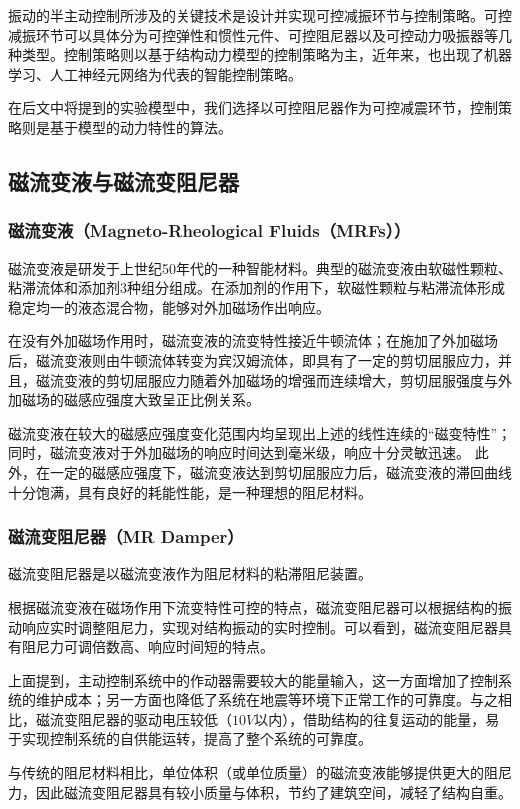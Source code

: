 振动的半主动控制所涉及的关键技术是设计并实现可控减振环节与控制策略。\cite{Hu2001}可控减振环节可以具体分为可控弹性和惯性元件、可控阻尼器以及可控动力吸振器等几种类型。控制策略则以基于结构动力模型的控制策略为主，近年来，也出现了机器学习、人工神经元网络为代表的智能控制策略。

在后文中将提到的实验模型中，我们选择以可控阻尼器作为可控减震环节，控制策略则是基于模型的动力特性的算法。

\subsection{磁流变液与磁流变阻尼器}
\subsubsection{磁流变液（Magneto-Rheological Fluids（MRFs））}
磁流变液是研发于上世纪50年代的一种智能材料。典型的磁流变液由软磁性颗粒、粘滞流体和添加剂3种组分组成。在添加剂的作用下，软磁性颗粒与粘滞流体形成稳定均一的液态混合物，能够对外加磁场作出响应。

在没有外加磁场作用时，磁流变液的流变特性接近牛顿流体；在施加了外加磁场后，磁流变液则由牛顿流体转变为宾汉姆流体，即具有了一定的剪切屈服应力，并且，磁流变液的剪切屈服应力随着外加磁场的增强而连续增大，剪切屈服强度与外加磁场的磁感应强度大致呈正比例关系。

磁流变液在较大的磁感应强度变化范围内均呈现出上述的线性连续的“磁变特性”；同时，磁流变液对于外加磁场的响应时间达到毫米级，响应十分灵敏迅速\cite{Ali2015}。
此外，在一定的磁感应强度下，磁流变液达到剪切屈服应力后，磁流变液的滞回曲线十分饱满，具有良好的耗能性能，是一种理想的阻尼材料。

\subsubsection{磁流变阻尼器（MR Damper）}
磁流变阻尼器是以磁流变液作为阻尼材料的粘滞阻尼装置。

根据磁流变液在磁场作用下流变特性可控的特点，磁流变阻尼器可以根据结构的振动响应实时调整阻尼力，实现对结构振动的实时控制。可以看到，磁流变阻尼器具有阻尼力可调倍数高、响应时间短的特点\cite{Zhang2010}。

上面提到，主动控制系统中的作动器需要较大的能量输入，这一方面增加了控制系统的维护成本；另一方面也降低了系统在地震等环境下正常工作的可靠度。与之相比，磁流变阻尼器的驱动电压较低（$10V$以内），借助结构的往复运动的能量，易于实现控制系统的自供能运转，提高了整个系统的可靠度。

与传统的阻尼材料相比，单位体积（或单位质量）的磁流变液能够提供更大的阻尼力，因此磁流变阻尼器具有较小质量与体积，节约了建筑空间，减轻了结构自重。


